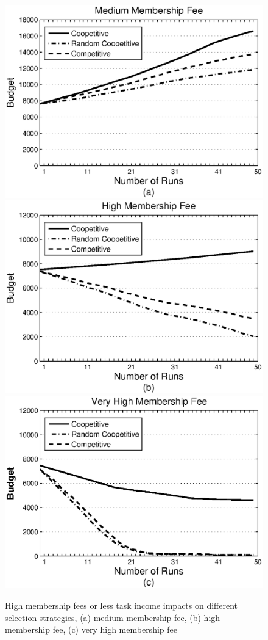 \documentclass[runningheads,a4paper]{llncs}
\begin{document}
\begin{figure}%
\centering
\includegraphics[scale=0.275]{graphbgtmed3set.eps}
\includegraphics[scale=0.275]{graphbgthigh.eps}
\includegraphics[scale=0.275]{graphbgtveryhigh.eps}
\caption{High membership fees or less task income impacts on different selection strategies, (a) medium membership fee, (b) high membership fee, (c) very high membership fee} \label{membership_fee_graph}
\end{figure}
\end{document}
